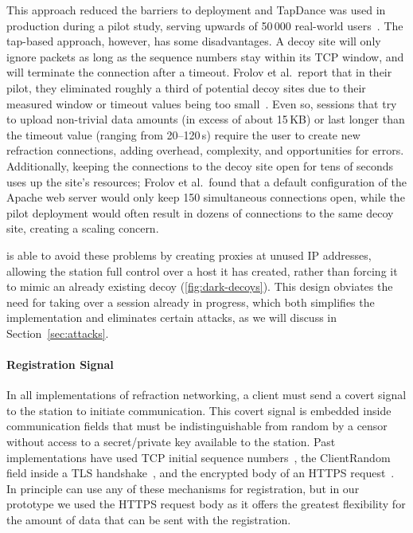 This approach reduced the barriers to deployment and TapDance was used in production during a pilot study, serving upwards of 50\,000 real-world users~\cite{frolov2017isp}. 
The tap-based approach, however, has some disadvantages. A decoy site will only ignore packets as long as the sequence numbers stay within its TCP window, and will terminate the connection after a timeout. Frolov et al.\ report that in their pilot, they eliminated roughly a third of potential decoy sites due to their measured window or timeout values being too small~\cite{frolov2017isp}. Even so, sessions that try to upload non-trivial data amounts (in excess of about 15\,KB) or last longer than the timeout value (ranging from 20--120\,s) require the user to create new refraction connections, adding overhead, complexity, and opportunities for errors. Additionally, keeping the connections to the decoy site open for tens of seconds uses up the site's resources; Frolov et al.\ found that a default configuration of the Apache web server would only keep 150 simultaneous connections open, while the pilot deployment would often result in dozens of connections to the same decoy site, creating a scaling concern.

\scheme is able to avoid these problems by creating proxies at unused IP addresses, allowing the station full control over a host it has created, rather than forcing it to mimic an already existing decoy (\cref{fig:dark-decoys}).
This design obviates the need for taking over a session already in progress, which both simplifies the implementation and eliminates certain attacks, as we will discuss in Section~\ref{sec:attacks}.

\paragraph{Registration Signal} In all implementations of refraction networking, a client must send a covert signal to the station to initiate communication. This covert signal is  embedded inside communication fields that must be indistinguishable from random by a censor without access to a secret/private key available to the station. Past implementations have used TCP initial sequence numbers~\cite{cirripede11}, the ClientRandom field inside a TLS handshake~\cite{curveball11,telex11}, and the encrypted body of an HTTPS request~\cite{tapdance14}. In principle \scheme can use any of these mechanisms for registration, but in our prototype we used the HTTPS request body as it offers the greatest flexibility for the amount of data that can be sent with the registration.
